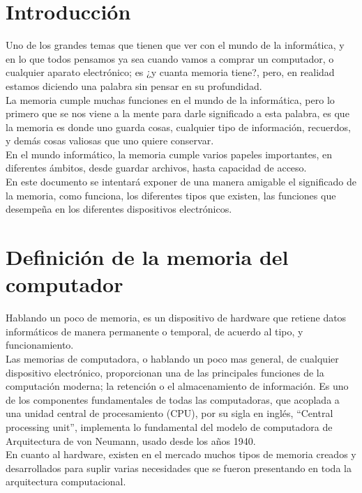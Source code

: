 \documentclass[10pt,letterpaper]{article}
\begin{document}
\tableofcontents

\newpage
\section{Introducción}

\begin{justify}
	Uno de los grandes temas que tienen que ver con el mundo de la informática, y en lo que todos pensamos ya sea cuando vamos a comprar un computador, o cualquier aparato electrónico; es ¿y cuanta memoria tiene?, pero, en realidad estamos diciendo una palabra sin pensar en su profundidad.\\
	
	\noindent
	La memoria cumple muchas funciones en el mundo de la informática, pero lo primero que se nos viene a la mente para darle significado a esta palabra, es que la memoria es donde uno guarda cosas, cualquier tipo de información, recuerdos, y demás cosas valiosas que uno quiere conservar.\\
	
	\noindent
	En el mundo informático, la memoria cumple varios papeles importantes, en diferentes ámbitos, desde guardar archivos, hasta capacidad de acceso.\\
	
	\noindent
	En este documento se intentará exponer de una manera amigable el significado de la memoria, como funciona, los diferentes tipos que existen, las funciones que desempeña en los diferentes dispositivos electrónicos.
\end{justify}

\newpage
\section{Definición de la memoria del computador} \label{contenido}

\begin{justify}
	Hablando un poco de memoria, es un dispositivo de hardware que retiene datos informáticos de manera permanente o temporal, de acuerdo al tipo, y funcionamiento.\\
	
	\noindent
	Las memorias de computadora, o hablando un poco mas general, de cualquier dispositivo electrónico, proporcionan una de las principales funciones de la computación moderna; la retención o el almacenamiento de información. Es uno de los componentes fundamentales de todas las computadoras, que acoplada a una unidad central de procesamiento (CPU), por su sigla en inglés, “Central processing unit”, implementa lo fundamental del modelo de computadora de Arquitectura de von Neumann, usado desde los años 1940.\cite{primera} \\ 
	
	\noindent
	En cuanto al hardware, existen en el mercado muchos tipos de memoria creados y desarrollados para suplir varias necesidades que se fueron presentando en toda la arquitectura computacional.
	
\end{justify}
 
\end{document}
